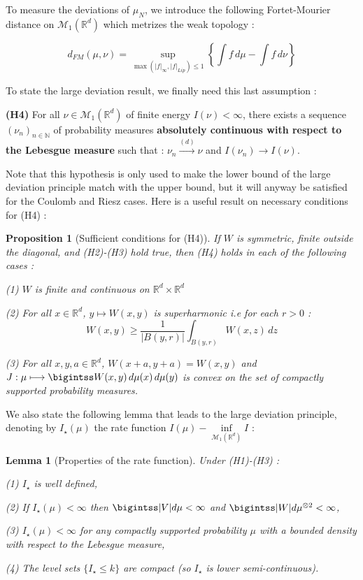 \documentclass[a4paper,12pt]{report}
\newtheorem*{prop}{Proposition}
\newtheorem*{lem}{Lemma}
\begin{document}
To measure the deviations of $\mu_{N}$, we introduce the following Fortet-Mourier distance on $\mathcal{M}_{1}(\mathbb{R}^{d})$ which metrizes the weak topology : 

\[d_{FM}(\mu, \nu) = \underset{\max (\lvert f \rvert_{\infty}, \lvert f \rvert_{Lip}) \leq 1}{\sup} \left\{ \int f\,d\mu - \int f\,d\nu\right\}\]

To state the large deviation result, we finally need this last assumption :

\textbf{(H4)} For all $\nu \in \mathcal{M}_{1}(\mathbb{R}^{d})$ of finite energy $I(\nu) < \infty$, there exists a sequence $(\nu_{n})_{n \in \mathbb{N}}$ of probability measures \textbf{absolutely continuous with respect to the Lebesgue measure} such that : $\nu_{n} \overset{(d)}{\longrightarrow} \nu$ and $I(\nu_{n}) \longrightarrow I(\nu)$.
\vspace{0.5cm}

Note that this hypothesis is only used to make the lower bound of the large deviation principle match with the upper bound, but it will anyway be satisfied for the Coulomb and Riesz cases. Here is a useful result on necessary conditions for (H4) :

\begin{prop}[Sufficient conditions for (H4)]

If $W$ is symmetric, finite outside the diagonal, and (H2)-(H3) hold true, then (H4) holds in each of the following cases :

(1) $W$ is finite and continuous on $\mathbb{R}^{d}\times \mathbb{R}^{d}$

(2) For all $x \in \mathbb{R}^{d}$, $y \longmapsto W(x, y)$ is superharmonic i.e for each $r > 0$ : \[W(x, y) \geq \frac{1}{\lvert B(y, r)\rvert} \int_{B(y, r)} W(x, z)\, dz\]

(3) For all $x, y, a \in \mathbb{R}^{d}$, $W(x+a, y+a) = W(x, y)$ and $J : \mu \longmapsto \bigintss W(x, y) \,d\mu(x)\,d\mu(y)$ is convex on the set of compactly supported probability measures.
\end{prop}

We also state the following lemma that leads to the large deviation principle, denoting by $I_{\star}(\mu)$ the rate function $I(\mu) - \underset{\mathcal{M}_{1}(\mathbb{R}^{d})}{\inf} I$ :

\begin{lem}[Properties of the rate function]

Under (H1)-(H3) :

(1) $I_{\star}$ is well defined,

(2) If $I_{\star}(\mu) < \infty$ then $\bigintss \lvert V\rvert d\mu < \infty$ and $\bigintss \lvert W\rvert d\mu^{\otimes 2} < \infty$,

(3) $I_{\star}(\mu) < \infty$ for any compactly supported probability $\mu$ with a bounded density with respect to the Lebesgue measure,

(4) The level sets $\{I_{\star} \leq k\}$ are compact (so $I_{\star}$ is lower semi-continuous).
\end{lem}
\end{document}

